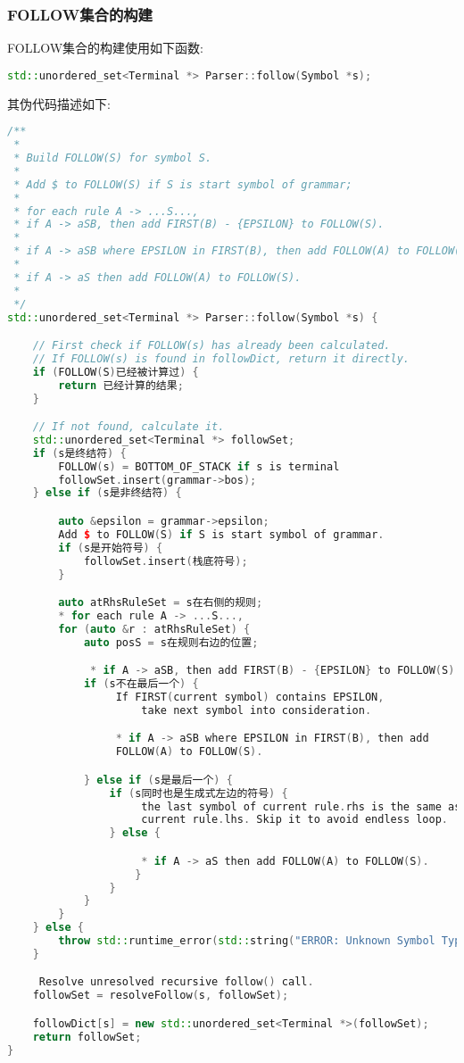 \subsubsection{FOLLOW集合的构建}
FOLLOW集合的构建使用如下函数:
\begin{lstlisting}[language=c++]
std::unordered_set<Terminal *> Parser::follow(Symbol *s);
\end{lstlisting}
其伪代码描述如下:
\begin{lstlisting}[language=c++]
/**
 *
 * Build FOLLOW(S) for symbol S.
 *
 * Add $ to FOLLOW(S) if S is start symbol of grammar;
 *
 * for each rule A -> ...S...,
 * if A -> aSB, then add FIRST(B) - {EPSILON} to FOLLOW(S).
 *
 * if A -> aSB where EPSILON in FIRST(B), then add FOLLOW(A) to FOLLOW(S).
 *
 * if A -> aS then add FOLLOW(A) to FOLLOW(S).
 *
 */
std::unordered_set<Terminal *> Parser::follow(Symbol *s) {

    // First check if FOLLOW(s) has already been calculated.
    // If FOLLOW(s) is found in followDict, return it directly.
    if (FOLLOW(S)已经被计算过) {
        return 已经计算的结果;
    }

    // If not found, calculate it.
    std::unordered_set<Terminal *> followSet;
    if (s是终结符) {
        FOLLOW(s) = BOTTOM_OF_STACK if s is terminal
        followSet.insert(grammar->bos);
    } else if (s是非终结符) {

        auto &epsilon = grammar->epsilon;
        Add $ to FOLLOW(S) if S is start symbol of grammar.
        if (s是开始符号) {
            followSet.insert(栈底符号);
        }

        auto atRhsRuleSet = s在右侧的规则;
        * for each rule A -> ...S...,
        for (auto &r : atRhsRuleSet) {
            auto posS = s在规则右边的位置;

             * if A -> aSB, then add FIRST(B) - {EPSILON} to FOLLOW(S).
            if (s不在最后一个) {
                 If FIRST(current symbol) contains EPSILON,
                     take next symbol into consideration.

                 * if A -> aSB where EPSILON in FIRST(B), then add
                 FOLLOW(A) to FOLLOW(S).

            } else if (s是最后一个) {
                if (s同时也是生成式左边的符号) {
                     the last symbol of current rule.rhs is the same as
                     current rule.lhs. Skip it to avoid endless loop.
                } else {

                     * if A -> aS then add FOLLOW(A) to FOLLOW(S).
                    }
                }
            }
        }
    } else {
        throw std::runtime_error(std::string("ERROR: Unknown Symbol Type"));
    }

     Resolve unresolved recursive follow() call.
    followSet = resolveFollow(s, followSet);

    followDict[s] = new std::unordered_set<Terminal *>(followSet);
    return followSet;
}
\end{lstlisting}
